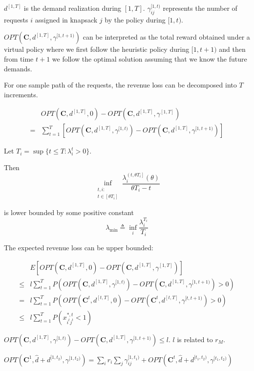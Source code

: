 $d^{[1, T]}$ is the demand realization during $[1, T]$. $\gamma_{ij}^{[1, t)}$ represents the number of requests $i$ assigned in knapsack $j$ by the policy during $[1, t)$.

$OPT(\bm{C}, d^{[1, T]}, \gamma^{[1,t+1)})$ can be interpreted as the total reward obtained under a virtual policy where we first follow the heuristic policy during $[1, t+1)$ and then from time $t+1$ we follow the optimal solution assuming that we know the future demands.

For one sample path of the requests, the revenue loss can be decomposed into $T$ increments.

\begin{align*}
    & OPT(\bm{C}, d^{[1, T]}, 0) - OPT(\bm{C}, d^{[1, T]}, \gamma^{[1, T]}) \\
 = & \sum_{t=1}^{T} [OPT(\bm{C}, d^{[1,T]}, \gamma^{[1,t)}) - OPT(\bm{C}, d^{[1,T]}, \gamma^{[1,t+1)})]
\end{align*}


Let $T_{i} = \sup\{t \leq T: \lambda_{i}^{t}> 0\}$. 

Then 
$$
\inf_{\substack{t, i: \\ t \in\left[\theta T_{i}\right]}} \frac{\lambda_{i}^{\left(t, \theta T_{i}\right]}(\theta)}{\theta T_{i}-t}
$$

is lower bounded by some positive constant 
$$
\lambda_{\min } \triangleq \inf_{i} \frac{\lambda_{i}^{T_{i}}}{T_{i}}
$$


The expected revenue loss can be upper bounded:

\begin{align*}
    & E[OPT(\bm{C}, d^{[1, T]}, 0) - OPT(\bm{C}, d^{[1, T]}, \gamma^{[1, T]})] \\
 \leq & l \sum_{t=1}^{T} P(OPT(\bm{C}, d^{[1, T]}, \gamma^{[1,t)}) - OPT(\bm{C}, d^{[1, T]}, \gamma^{[1,t+1)}) > 0) \\
 = & l \sum_{t=1}^{T} P(OPT(\bm{C}^{t}, d^{[t, T]}, 0) - OPT(\bm{C}^{t}, d^{[t, T]}, \gamma^{[t,t+1)}) > 0) \\
 \leq & l \sum_{t=1}^{T} P(x_{i^{t}j^{t}}^{*,t} <1)
\end{align*}

$OPT(\bm{C}, d^{[1, T]}, \gamma^{[1,t)}) - OPT(\bm{C}, d^{[1, T]}, \gamma^{[1,t+1)}) \leq l$.
$l$ is related to $r_{M}$.

\begin{lem}\label{additive}
$OPT(\bm{C}^{1}, \hat{d} + d^{[1, t_2)} , \gamma^{[1, t_2)}) = \sum_{i} r_{i} \sum_{j} \gamma_{ij}^{[1, t_1)} + OPT(\bm{C}^{t}, \hat{d}+d^{[t_1, t_2)}, \gamma^{[t_1, t_2)})$
\end{lem}

